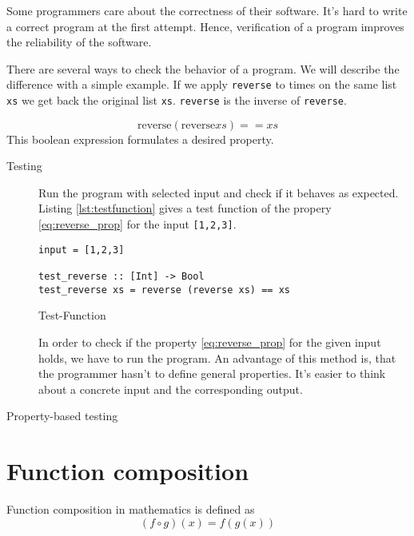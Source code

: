 \documentclass[twoside, a4paper]{article}
\begin{document}
Some programmers care about the correctness of their software. It's hard to write a correct program at the first attempt. 
Hence, verification of a program improves the reliability of the software.

There are several ways to check the behavior of a program. 
We will describe the difference with a simple example.
If we apply \verb|reverse| to times on the same list \verb|xs| we get back the original list \verb|xs|. \verb|reverse| is the inverse of \verb|reverse|. 


\begin{equation}
  \label{eq:reverse_prop}
\text{reverse} (\text{reverse} xs) == xs  
\end{equation}
This boolean expression formulates a desired property. 

\begin{description}
\item[Testing] Run the program with selected input and check if it behaves as expected. Listing \ref{lst:testfunction} gives a test function of the propery \ref{eq:reverse_prop} for the input \verb|[1,2,3]|.
  \label{fig:test}
\begin{program}
\begin{verbatim}
input = [1,2,3]

test_reverse :: [Int] -> Bool
test_reverse xs = reverse (reverse xs) == xs
\end{verbatim}
\caption{Test-Function}
\label{lst:testfunction}
\end{program}

In order to check if the property \ref{eq:reverse_prop} for the given input holds, we have to run the program.
 An advantage of this method is, that the programmer hasn't to define general properties. It's easier to think about a concrete input and the corresponding output.

\item[Property-based testing]  
\end{description}

\section{Function composition}
\label{sec:functioncomposition}

Function composition in mathematics is defined as
\begin{equation}
  \label{eq:functioncomposition}
  (f \circ g)(x) = f(g(x))
\end{equation}
\end{document}
